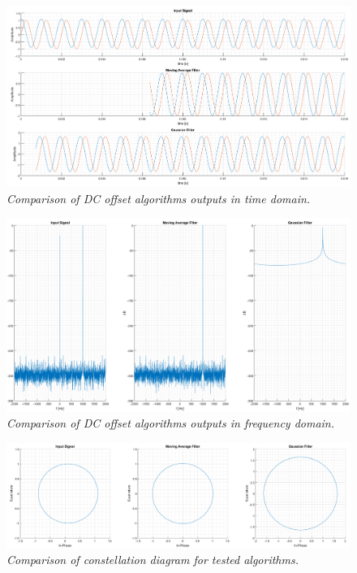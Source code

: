 \documentclass[en,printmode]{mgr}
\begin{document}
			\begin{figure}[!htb]
    			\centering
   				\includegraphics[width=\textwidth]{plots/dc_comp.png}
   		 		\caption{\textit{Comparison of DC offset algorithms outputs in time domain.}}
			\end{figure}
			\vspace{1cm}		
			\begin{figure}[!htb]
    			\centering
   				\includegraphics[width=\textwidth]{plots/dc_f.png}
   		 		\caption{\textit{Comparison of DC offset algorithms outputs in frequency domain.}}
			\end{figure}		
			\begin{figure}[!htb]
    			\centering
   				\includegraphics[width=\textwidth]{plots/dc_c.png}
   		 		\caption{\textit{Comparison of constellation diagram for tested algorithms.}}
			\end{figure}
			
\end{document}
